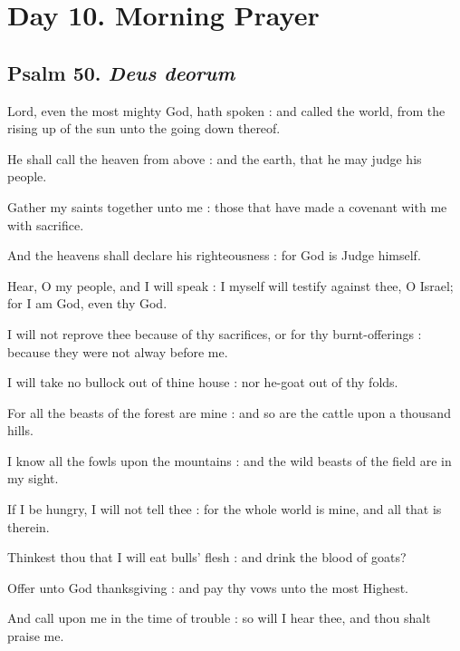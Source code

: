 \clearpage
\section*{Day 10. Morning Prayer}

\subsection{Psalm 50. \textit{Deus deorum}}

 Lord, even the most mighty God, hath spoken : and called the world, from the rising up of the sun unto the going down thereof.\par
{}
He shall call the heaven from above : and the earth, that he may judge his people.\par
{}Gather my saints together unto me : those that have made a covenant with me with sacrifice.\par
{}And the heavens shall declare his righteousness : for God is Judge himself.\par
{}Hear, O my people, and I will speak : I myself will testify against thee, O Israel; for I am God, even thy God.\par
{}I will not reprove thee because of thy sacrifices, or for thy burnt-offerings : because they were not alway before me.\par
{}I will take no bullock out of thine house : nor he-goat out of thy folds.\par
{}For all the beasts of the forest are mine : and so are the cattle upon a thousand hills.\par
{}I know all the fowls upon the mountains : and the wild beasts of the field are in my sight.\par
{}If I be hungry, I will not tell thee : for the whole world is mine, and all that is therein.\par
{}Thinkest thou that I will eat bulls' flesh : and drink the blood of goats?\par
{}Offer unto God thanksgiving : and pay thy vows unto the most Highest.\par
{}And call upon me in the time of trouble : so will I hear thee, and thou shalt praise me.\par
